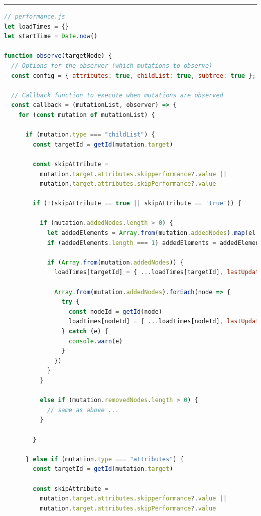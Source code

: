 \documentclass[a4paper, 12pt]{article}
\begin{document}
\hrule
\begin{lstlisting}[caption={Injected mutation recorder script}, label={lst:performance-recorder}, language=JavaScript, escapechar=°]
// performance.js
let loadTimes = {}
let startTime = Date.now()

function observe(targetNode) {
  // Options for the observer (which mutations to observe)
  const config = { attributes: true, childList: true, subtree: true };

  // Callback function to execute when mutations are observed
  const callback = (mutationList, observer) => {
    for (const mutation of mutationList) {

      if (mutation.type === "childList") {
        const targetId = getId(mutation.target)

        const skipAttribute =
          mutation.target.attributes.skipperformance?.value ||
          mutation.target.attributes.skipPerformance?.value

        if (!(skipAttribute == true || skipAttribute == 'true')) {

          if (mutation.addedNodes.length > 0) {
            let addedElements = Array.from(mutation.addedNodes).map(el => el.nodeName !== "#comment" && el.nodeName !== "#text" ? getXPath(el) : el)
            if (addedElements.length === 1) addedElements = addedElements[0]

            if (Array.from(mutation.addedNodes)) {
              loadTimes[targetId] = { ...loadTimes[targetId], lastUpdated: Date.now() - startTime, xpath: loadTimes[targetId]?.xpath || getXPath(mutation.target) }

              Array.from(mutation.addedNodes).forEach(node => {
                try {
                  const nodeId = getId(node)
                  loadTimes[nodeId] = { ...loadTimes[nodeId], lastUpdated: Date.now() - startTime, xpath: loadTimes[nodeId]?.xpath || getXPath(node)}
                } catch (e) {
                  console.warn(e)
                }
              })
            }
          }

          else if (mutation.removedNodes.length > 0) {
            // same as above ...
          }

        }

      } else if (mutation.type === "attributes") {
        const targetId = getId(mutation.target)

        const skipAttribute =
          mutation.target.attributes.skipperformance?.value ||
          mutation.target.attributes.skipPerformance?.value


\end{lstlisting}
\end{document}
